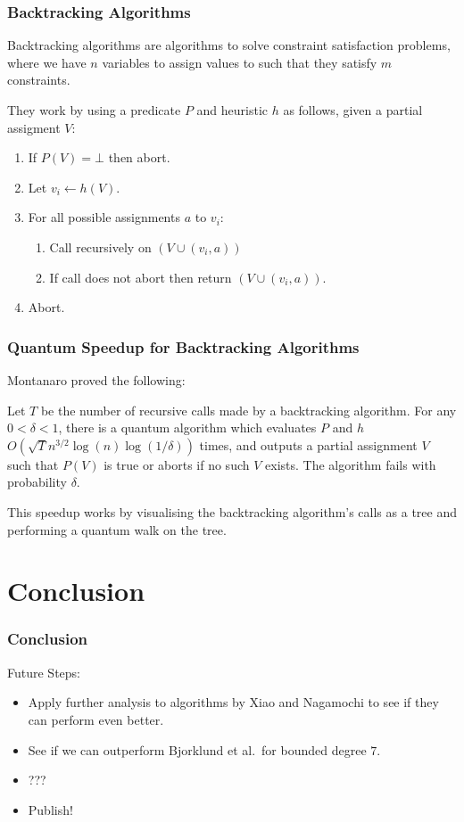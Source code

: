 \documentclass[aspectratio=169]{beamer}
\begin{document}
\begin{frame}
\frametitle{Backtracking Algorithms}
Backtracking algorithms are algorithms to solve constraint satisfaction problems, where we have $n$ variables to assign values to such that they satisfy $m$ constraints.

They work by using a predicate $P$ and heuristic $h$ as follows, given a partial assigment $V$:

\begin{enumerate}
\item If $P(V) = \bot$ then abort.
\item Let $v_{i} \leftarrow h(V)$.
\item For all possible assignments $a$ to $v_{i}$:
\begin{enumerate}
\item Call recursively on $(V \cup (v_{i}, a))$
\item If call does not abort then return $(V \cup (v_{i}, a))$.
\end{enumerate}
\item Abort.
\end{enumerate}
\end{frame}

\begin{frame}
\frametitle{Quantum Speedup for Backtracking Algorithms}

Montanaro proved the following:

\begin{theorem}[Montanaro]
Let $T$ be the number of recursive calls made by a backtracking algorithm. For any $0 < \delta < 1$, there is a quantum algorithm which evaluates $P$ and $h$ $O(\sqrt{T}n^{3/2}\log(n)\log(1/\delta))$ times, and outputs a partial assignment $V$ such that $P(V)$ is true or aborts if no such $V$ exists. The algorithm fails with probability $\delta$.
\end{theorem}

This speedup works by visualising the backtracking algorithm's calls as a tree and performing a quantum walk on the tree.
\end{frame}

\section{Conclusion}

\begin{frame}
\frametitle{Conclusion}
Future Steps:
\begin{itemize}
\item Apply further analysis to algorithms by Xiao and Nagamochi to see if they can perform even better.
\item See if we can outperform Bjorklund et al.\ for bounded degree $7$.
\item ???
\item Publish!
\end{itemize}
\end{frame}
\end{document}
